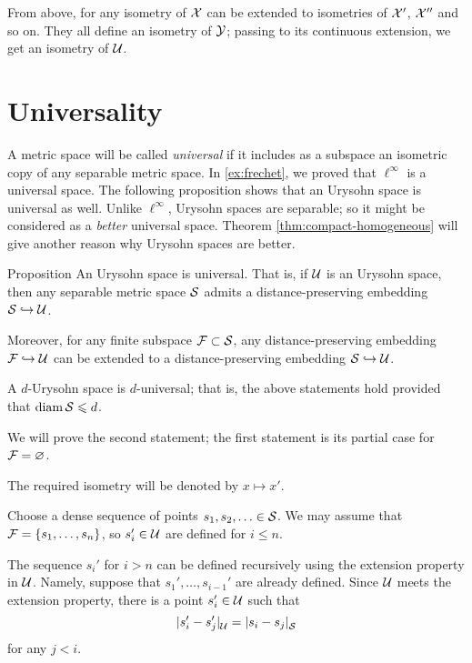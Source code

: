 From above, for any isometry of $\mathcal{X}$ can be extended to isometries of $\mathcal{X}'$, $\mathcal{X}''$ and so on.
They all define an isometry of $\mathcal{Y}$;
passing to its continuous extension, we get an isometry of $\mathcal{U}$.
\qeds


\section{Universality}

A metric space will be called \emph{universal} if it includes as a subspace an isometric copy of any separable metric space.
In \ref{ex:frechet}, we proved that $\ell^\infty$ is a universal space. 
The following proposition shows that an Urysohn space is universal as well.
Unlike $\ell^\infty$, Urysohn spaces are separable;
so it might be considered as a \textit{better} universal space.
Theorem \ref{thm:compact-homogeneous} will give another reason why Urysohn spaces are better.

\begin{thm}{Proposition}\label{prop:sep-in-urys}
An Urysohn space is universal.
That is, if $\mathcal{U}$ is an Urysohn space, then any separable metric space $\mathcal{S}$ admits a distance-preserving embedding $\mathcal{S}\hookrightarrow\mathcal{U}$.

Moreover, for any finite subspace $\mathcal{F}\subset \mathcal{S}$,
any distance-preserving embedding $\mathcal{F}\hookrightarrow \mathcal{U}$ can be extended to a distance-preserving embedding $\mathcal{S}\hookrightarrow\mathcal{U}$.

A $d$-Urysohn space is $d$-universal;
that is, the above statements hold provided that $\operatorname{\rm diam}\nolimits\mathcal{S}\leqslant d$.  
\end{thm}

We will prove the second statement;
the first statement is its partial case for $\mathcal{F}=\varnothing$.

The required isometry will be denoted by $x\mapsto x'$.

Choose a dense sequence of points $s_1,s_2,\dotsc\in\mathcal{S}$.
We may assume that $\mathcal{F}=\{s_1,\dots,s_n\}$, so $s_i'\in \mathcal{U}$ are defined for $i\le n$.

The sequence $s_i'$ for $i>n$ can be defined recursively using the extension property in $\mathcal{U}$.
Namely, suppose that $s_1',\dots,s_{i-1}'$ are already defined.
Since $\mathcal{U}$ meets the extension property, there is a point $s_i'\in \mathcal{U}$ such that
\[\dist{s_i'}{s_j'}{\spc{U}}=\dist{s_i}{s_j}{\spc{S}}\]
for any $j<i$.

